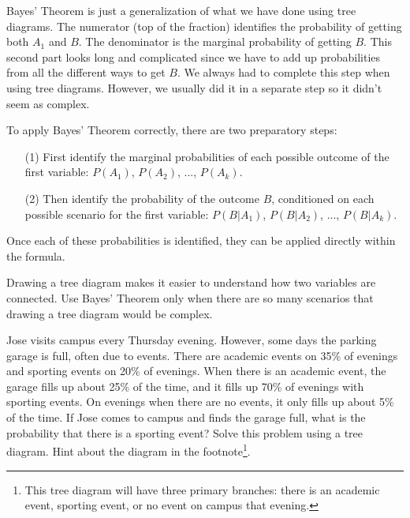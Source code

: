 Bayes' Theorem is just a generalization of what we have done using tree diagrams. The numerator (top of the fraction) identifies the probability of getting both $A_1$ and $B$. The denominator is the marginal probability of getting $B$. This second part looks long and complicated since we have to add up probabilities from all the different ways to get $B$. We always had to complete this step when using tree diagrams. However, we usually did it in a separate step so it didn't seem as complex.

To apply Bayes' Theorem correctly, there are two preparatory steps:
\begin{enumerate}
\item[(1)] First identify the marginal probabilities of each possible outcome of the first variable: $P(A_1)$, $P(A_2)$, ..., $P(A_k)$.
\item[(2)] Then identify the probability of the outcome $B$, conditioned on each possible scenario for the first variable: $P(B | A_1)$, $P(B | A_2)$, ..., $P(B | A_k)$.
\end{enumerate}
Once each of these probabilities is identified, they can be applied directly within the formula.

\begin{tipBox}{
Drawing a tree diagram makes it easier to understand how two variables are connected. Use Bayes' Theorem only when there are so many scenarios that drawing a tree diagram would be complex.}
\end{tipBox}

\begin{exercise} \label{exerciseForParkingLotOnCampusBeingFullAndWhetherOrNotThereIsASportingEvent}
Jose visits campus every Thursday evening. However, some days the parking garage is full, often due to events. There are academic events on 35\% of evenings and sporting events on 20\% of evenings. When there is an academic event, the garage fills up about 25\% of the time, and it fills up 70\% of evenings with sporting events. On evenings when there are no events, it only fills up about 5\% of the time. If Jose comes to campus and finds the garage full, what is the probability that there is a sporting event? Solve this problem using a tree diagram. Hint about the diagram in the footnote\footnote{This tree diagram will have three primary branches: there is an academic event, sporting event, or no event on campus that evening.}.
\end{exercise}

